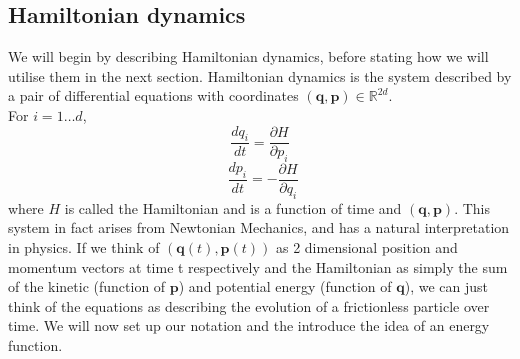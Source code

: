 \documentclass[11pt]{article}
\begin{document}
\subsection{Hamiltonian dynamics}
We will begin by describing Hamiltonian dynamics, before stating how we will utilise them in the next section. Hamiltonian dynamics is the system described by a pair of differential equations with coordinates $(\mathbf{q},\mathbf{p}) \in \mathbb{R}^{2d}$.\\ For $i=1 \dots d$,
\begin{equation}
\frac{dq_{i}}{dt} = \frac{\partial H}{\partial p_{i}}
\end{equation}
\begin{equation}
\ \ \frac{dp_{i}}{dt} = -\frac{\partial H}{\partial q_{i}}
\end{equation}
where $H$ is called the Hamiltonian and is a function of time and $(\mathbf{q},\mathbf{p})$. This system in fact arises from Newtonian Mechanics, and has a natural interpretation in physics. If we think of $(\mathbf{q}(t),\mathbf{p}(t))$ as 2 dimensional position and momentum  vectors at time t respectively and the Hamiltonian as simply the sum of the kinetic (function of $\mathbf{p}$) and potential energy (function of $\mathbf{q}$), we can just think of the equations as describing the evolution of a frictionless particle over time. We will now set up our notation and the introduce the idea of an energy function.
\end{document}
